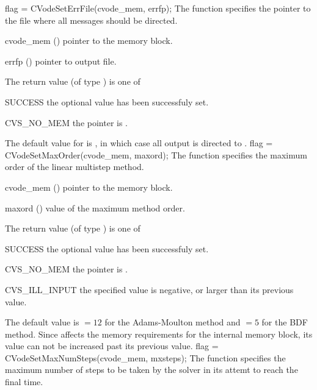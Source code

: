 {
  flag = CVodeSetErrFile(cvode\_mem, errfp);
}
{
  The function  specifies the pointer to the file
  where all {\cvodes} messages should be directed.
}
{
  \begin{args}
  \item[cvode\_mem] ()
    pointer to the {\cvodes} memory block.
  \item[errfp] ()
    pointer to output file.
  \end{args}
}
{
  The return value  (of type ) is one of
  \begin{args}
  \item[SUCCESS] 
    the optional value has been successfuly set.
  \item[CVS\_NO\_MEM]
    the  pointer is .
  \end{args}
}
{
  The default value for  is , in which case
  all output is directed to .
}
{
flag = CVodeSetMaxOrder(cvode\_mem, maxord);
}
{
  The function  specifies the maximum order of the 
  linear multistep method.
}
{
  \begin{args}
  \item[cvode\_mem] ()
    pointer to the {\cvodes} memory block.
  \item[maxord] ()
    value of the maximum method order.
  \end{args}
}
{
  The return value  (of type ) is one of
  \begin{args}
  \item[SUCCESS] 
    the optional value has been successfuly set.
  \item[CVS\_NO\_MEM]
    the  pointer is .
  \item[CVS\_ILL\_INPUT]
    the specified value  is negative, or larger than 
    its previous value.
  \end{args}
}
{
  The default value is $= 12$ for
  the Adams-Moulton method and $= 5$
  for the BDF method.
  Since  affects the memory requirements
  for the internal {\cvodes} memory block, its value
  can not be increased past its previous value.
}
{
flag = CVodeSetMaxNumSteps(cvode\_mem, mxsteps);
}
{
  The function  specifies the maximum number
  of steps to be taken by the solver in its attemt to reach 
  the final time.
}
